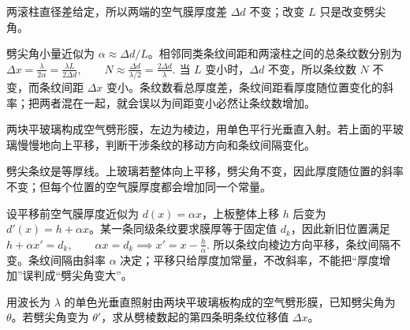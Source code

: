 \begin{solution}
两滚柱直径差给定，所以两端的空气膜厚度差 \(\Delta d\) 不变；改变 \(L\) 只是改变劈尖角。

劈尖角小量近似为 \(\alpha\approx\Delta d/L\)。相邻同类条纹间距和两滚柱之间的总条纹数分别为
 \(\Delta x=\frac{\lambda}{2\alpha} =\frac{\lambda L}{2\Delta d},\qquad N\approx\frac{\Delta d}{\lambda/2} =\frac{2\Delta d}{\lambda}.\) 
当 \(L\) 变小时，\(\Delta d\) 不变，所以条纹数 \(N\) 不变，而条纹间距 \(\Delta x\) 变小。条纹数看总厚度差，条纹间距看厚度随位置变化的斜率；把两者混在一起，就会误以为间距变小必然让条纹数增加。
\end{solution}

\begin{exercise}
两块平玻璃构成空气劈形膜，左边为棱边，用单色平行光垂直入射。若上面的平玻璃慢慢地向上平移，判断干涉条纹的移动方向和条纹间隔变化。
\end{exercise}

\begin{solution}
劈尖条纹是等厚线。上玻璃若整体向上平移，劈尖角不变，因此厚度随位置的斜率不变；但每个位置的空气膜厚度都会增加同一个常量。

设平移前空气膜厚度近似为 \(d(x)=\alpha x\)，上板整体上移 \(h\) 后变为 \(d'(x)=h+\alpha x\)。某一条同级条纹要求膜厚等于固定值 \(d_k\)，因此新旧位置满足
 \(h+\alpha x'=d_k,\qquad \alpha x=d_k \implies x'=x-\frac{h}{\alpha}.\) 
所以条纹向棱边方向平移，条纹间隔不变。条纹间隔由斜率 \(\alpha\) 决定；平移只给厚度加常量，不改斜率，不能把“厚度增加”误判成“劈尖角变大”。
\end{solution}


\begin{exercise}
用波长为 \(\lambda\) 的单色光垂直照射由两块平玻璃板构成的空气劈形膜，已知劈尖角为 \(\theta\)。若劈尖角变为 \(\theta'\)，求从劈棱数起的第四条明条纹位移值 \(\Delta x\)。
\end{exercise}

